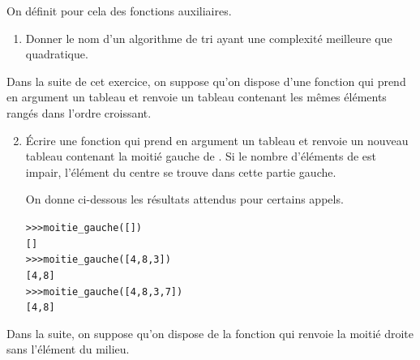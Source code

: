 \documentclass[11pt,a4paper,french,twoside]{PMCours}
\begin{document}
On définit pour cela des fonctions auxiliaires.
\begin{enumerate}
\item Donner le nom d'un algorithme de tri ayant une complexité meilleure que quadratique.
\end{enumerate}

Dans la suite de cet exercice, on suppose qu'on dispose d'une fonction  qui prend en
argument un tableau et renvoie un tableau contenant les mêmes éléments rangés dans l'ordre
croissant.

\begin{enumerate}\setcounter{enumi}{1}
\item Écrire une fonction  qui prend en argument un tableau  et
renvoie un nouveau tableau contenant la moitié gauche de . Si le nombre d'éléments
de  est impair, l'élément du centre se trouve dans cette partie gauche.

On donne ci-dessous les résultats attendus pour certains appels.
\begin{alltt}
>>> moitie\_gauche([])
[]
>>> moitie\_gauche([4, 8, 3])
[4, 8]
>>> moitie\_gauche ([4, 8, 3, 7])
[4, 8]
\end{alltt}
\end{enumerate}

Dans la suite, on suppose qu'on dispose de la fonction  qui renvoie la
moitié droite sans l'élément du milieu.
\end{document}
